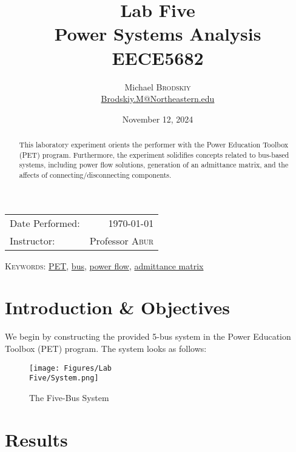 \documentclass[
	letterpaper, %
	10pt, %
]{CSUniSchoolLabReport}
\title{Lab Five\\ Power Systems Analysis \\ EECE5682} %
\author{Michael \textsc{Brodskiy}\\ \small \href{mailto:Brodskiy.M@Northeastern.edu}{Brodskiy.M@Northeastern.edu}}
\date{November 12, 2024} %
\begin{document}
\maketitle %

\begin{center}
	\begin{tabular}{l r}
		Date Performed: & \today \\ %
		Instructor: & Professor \textsc{Abur} \\ %
	\end{tabular}
\end{center}

\newpage

\begin{abstract}

  This laboratory experiment orients the performer with the Power Education Toolbox (PET) program. Furthermore, the experiment solidifies concepts related to bus-based systems, including power flow solutions, generation of an admittance matrix, and the affects of connecting/disconnecting components.

\end{abstract}

\begin{flushleft}

  \textsc{Keywords:} \underline{PET}, \underline{bus}, \underline{power flow}, \underline{admittance matrix}

\end{flushleft}

\newpage

\section{Introduction \& Objectives}

We begin by constructing the provided 5-bus system in the Power Education Toolbox (PET) program. The system looks as follows:

\begin{figure}[H]
  \centering
  \texttt{[image: Figures/Lab\\ Five/System.png]}
  \caption{The Five-Bus System}
  \label{fig:1}
\end{figure}

\section{Results}
\end{document}
